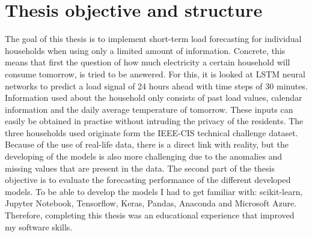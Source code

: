 \section{Thesis objective and structure}
The goal of this thesis is to implement short-term load forecasting for individual households when using only a limited amount of information. Concrete, this means that first the question of how much electricity a certain household will consume tomorrow, is tried to be answered. For this, it is looked at LSTM neural networks to predict a load signal of 24 hours ahead with time steps of 30 minutes. Information used about the household only consists of past load values, calendar information and the daily average temperature of tomorrow. These inputs can easily be obtained in practise without intruding the privacy of the residents. The three households used originate form the IEEE-CIS technical challenge dataset. Because of the use of real-life data, there is a direct link with reality, but the developing of the models is also more challenging due to the anomalies and missing values that are present in the data. The second part of the thesis objective is to evaluate the forecasting performance of the different developed models. To be able to develop the models I had to get familiar with: scikit-learn, Jupyter Notebook, Tensorflow, Keras, Pandas, Anaconda and Microsoft Azure. Therefore, completing this thesis was an educational experience that improved my software skills.\\ 


